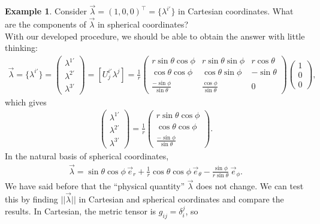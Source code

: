 \documentclass{book}
\theoremstyle{definition}
\newtheorem{exmp}{Example}[section]
\begin{document}
\begin{exmp}
	Consider $\vec{\lambda} = (1,0,0)^\top = \{\lambda^{i'}\}$ in Cartesian coordinates. What are the components of $\vec{\lambda}$ in spherical coordinates? \\
	
	With our developed procedure, we should be able to obtain the answer with little thinking:
	\begin{align*}
	\vec{\lambda} = \{ \lambda^{i'} \} = 
	\begin{pmatrix}
	\lambda^{1'} \\ \lambda^{2'} \\ \lambda^{3'}
	\end{pmatrix}
	=
	[U^{i'}_j\lambda^j]
	= 
	\frac{1}{r}
	\begin{pmatrix}
	r\sin\theta\cos\phi & r\sin\theta\sin\phi & r\cos\theta\\
	\cos\theta\cos\phi & \cos\theta\sin\phi & -\sin\theta\\
	\frac{-\sin\phi}{\sin\theta} & \frac{\cos\phi}{\sin\theta} & 0
	\end{pmatrix}
	\begin{pmatrix}
	1 \\ 0 \\ 0
	\end{pmatrix},
	\end{align*}
	which gives
	\begin{align*}
	\begin{pmatrix}
	\lambda^{1'} \\ \lambda^{2'} \\ \lambda^{3'}
	\end{pmatrix}
	=
	\frac{1}{r}
	\begin{pmatrix}
	r\sin\theta\cos\phi\\
	\cos\theta\cos\phi\\
	\frac{-\sin\phi}{\sin\theta}
	\end{pmatrix}.
	\end{align*}
	In the natural basis of spherical coordinates, 
	\begin{align*}
	\vec{\lambda} = \sin\theta\cos\phi\,\vec{e}_r + \frac{1}{r}\cos\theta\cos\phi\,\vec{e}_\theta - \frac{\sin\phi}{r\sin\theta}\,\vec{e}_\phi.
	\end{align*}
	We have said before that the ``physical quantity'' $\vec{\lambda}$ does not change. We can test this by finding $\vert\vert \vec{\lambda} \vert\vert$ in Cartesian and spherical coordinates and compare the results. In Cartesian, the metric tensor is $g_{ij} = \delta^j_i$, so

\end{exmp}
\end{document}
